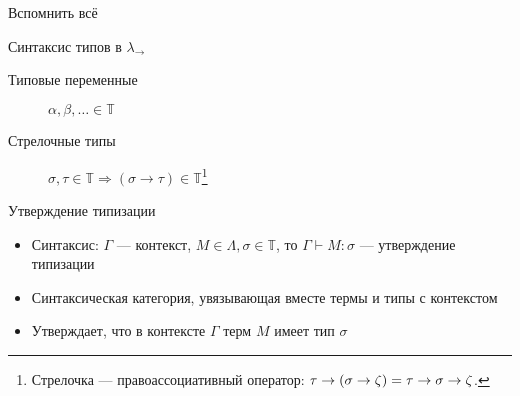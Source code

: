     \begin{frame}{Вспомнить всё}
        \pause
        \begin{block}{Синтаксис типов в $\lambda_{\rightarrow}$}
            \pause
            \begin{description}
                \item[Типовые переменные] \pause \vspace{-1em} $\alpha, \beta, \ldots \in \mathbb{T}$
                \pause
                \hspace{2em}
                \item[Стрелочные типы] \pause \vspace{-2em} $\sigma, \tau \in \mathbb{T} \Rightarrow (\sigma\rightarrow\tau)\in\mathbb{T}$\footnote{Стрелочка --- правоассоциативный оператор: $\tau \to (\sigma \to \zeta) = \tau \to \sigma \to \zeta$.}
                \hspace{2em}
                \pause
            \end{description}
        \end{block}
        \pause
        \begin{block}{Утверждение типизации}
            \pause
            \begin{itemize}
                \item \pause Синтаксис: $\Gamma$ --- контекст, $M \in \Lambda, \sigma \in \mathbb{T}$, то \pause $\Gamma \vdash M : \sigma$ --- утверждение типизации
                \item \pause Синтаксическая категория, увязывающая вместе термы и типы с контекстом
                \item \pause Утверждает, что в контексте $\Gamma$ терм $M$ имеет тип $\sigma$
            \end{itemize}
        \end{block}

\end{frame}
